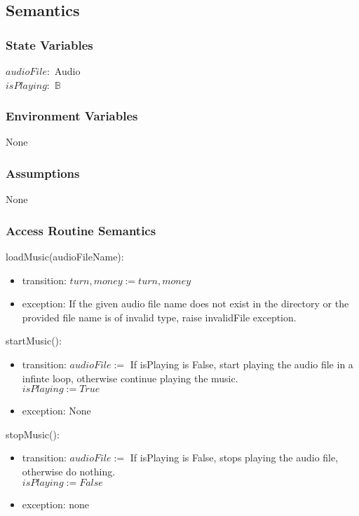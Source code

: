 \documentclass[12pt, titlepage]{article}
\begin{document}
\subsection{Semantics}

\subsubsection{State Variables}
$\mathit{audioFile}:$ Audio\\
$\mathit{isPlaying}:$ $\mathbb{B}$\\
\subsubsection{Environment Variables}

None

\subsubsection{Assumptions}

None

\subsubsection{Access Routine Semantics}

\noindent loadMusic(audioFileName):
\begin{itemize}
\item transition: $turn, money := turn, money$
\item exception: If the given audio file name does not exist in the directory or the provided file name is of invalid type, raise invalidFile exception.
\end{itemize}

\noindent startMusic():
\begin{itemize}
\item transition: $audioFile :=$ If isPlaying is False, start playing the audio file in a infinte loop, otherwise continue playing the music.\\
$isPlaying := True$

\item exception: None
\end{itemize}

\noindent stopMusic():
\begin{itemize}
\item transition: $audioFile :=$ If isPlaying is False, stops playing the audio file, otherwise do nothing.\\
$isPlaying := False$
\item exception: none
\end{itemize}
\end{document}
